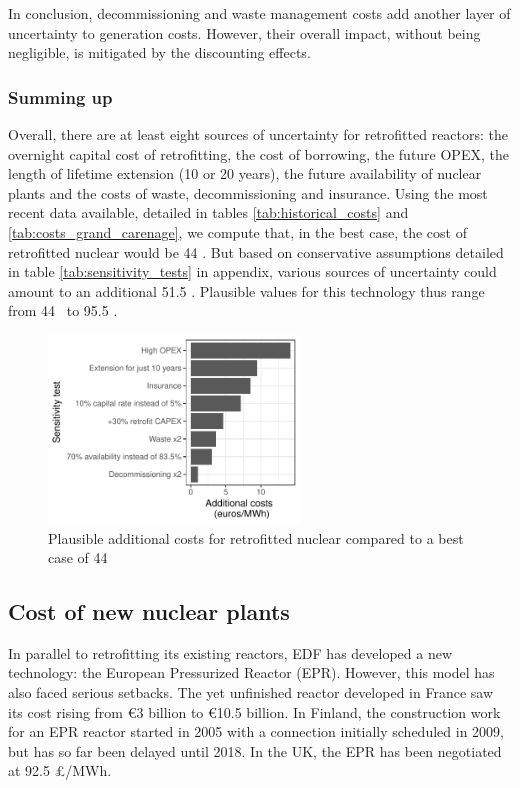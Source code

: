 In conclusion, decommissioning and waste management costs add another layer of uncertainty to generation costs. However, their overall impact, without being negligible, is mitigated by the discounting effects.


\subsubsection{Summing up}
Overall, there are at least eight sources of uncertainty for retrofitted reactors: the overnight capital cost of retrofitting, the cost of borrowing, the future OPEX, the length of lifetime extension (10 or 20 years), the future availability of nuclear plants and the costs of waste, decommissioning and insurance.
Using the most recent data available, detailed in tables \ref{tab:historical_costs} and \ref{tab:costs_grand_carenage}, we compute that, in the best case, the cost of retrofitted nuclear would be 44 \emwh. But based on conservative assumptions detailed in table \ref{tab:sensitivity_tests} in appendix, various sources of uncertainty could amount to an additional 51.5 \emwh. Plausible values for this technology thus range from 44 \emwh\ to 95.5 \emwh.


\begin{figure}[!ht]
	\centering
	\includegraphics[height=5cm]{figures/sensitivity_tests.pdf}
	\caption{Plausible additional costs for retrofitted nuclear compared to a best case of 44 \emwh}
	\label{fig:sensitivity_tests}
\end{figure}

\subsection{Cost of new nuclear plants}

In parallel to retrofitting its existing reactors, EDF has developed a new technology: the European Pressurized Reactor (EPR).
However, this model has also faced serious setbacks.
The yet unfinished reactor developed in France saw its cost rising from \euro 3 billion to \euro 10.5 billion.
In Finland, the construction work for an EPR reactor started in 2005 with a connection initially scheduled in 2009, but has so far been delayed until 2018.
In the UK, the EPR has been negotiated at 92.5 \pounds/MWh.

